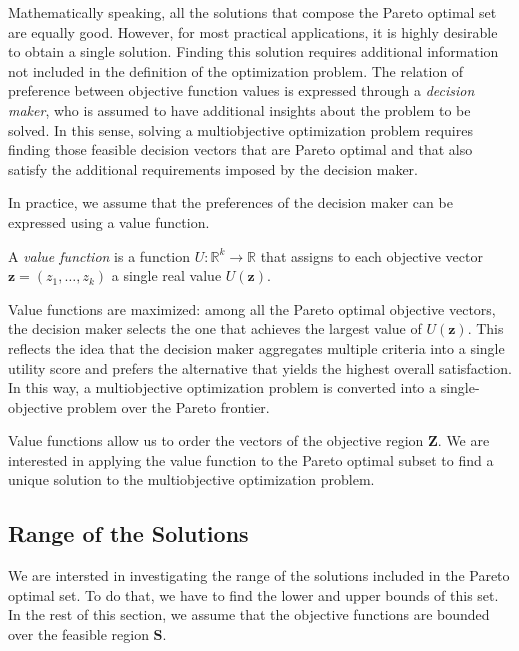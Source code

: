 Mathematically speaking, all the solutions that compose the Pareto optimal set are equally good. However, for most practical applications, it is highly desirable to obtain a single solution. Finding this solution requires additional information not included in the definition of the optimization problem. The relation of preference between objective function values is expressed through a \emph{decision maker}, who is assumed to have additional insights about the problem to be solved. In this sense, solving a multiobjective optimization problem requires finding those feasible decision vectors that are Pareto optimal and that also satisfy the additional requirements imposed by the decision maker.


In practice, we assume that the preferences of the decision maker can be expressed using a value function.

\begin{definition}
A \emph{value function} is a function $U : \mathbb{R}^k \rightarrow \mathbb{R}$ that assigns to each objective vector $\mathbf{z} = \left( z_1, \ldots, z_k \right)$ a single real value $U(\mathbf{z})$.
\end{definition}

Value functions are maximized: among all the Pareto optimal objective vectors, the decision maker selects the one that achieves the largest value of $U(\mathbf{z})$. This reflects the idea that the decision maker aggregates multiple criteria into a single utility score and prefers the alternative that yields the highest overall satisfaction. In this way, a multiobjective optimization problem is converted into a single-objective problem over the Pareto frontier.

Value functions allow us to order the vectors of the objective region $\mathbf{Z}$. We are interested in applying the value function to the Pareto optimal subset to find a unique solution to the multiobjective optimization problem.


\subsection{Range of the Solutions}
\label{sec:range_solutions}

We are intersted in investigating the range of the solutions included in the Pareto optimal set. To do that, we have to find the lower and upper bounds of this set. In the rest of this section, we assume that the objective functions are bounded over the feasible region $\mathbf{S}$.

